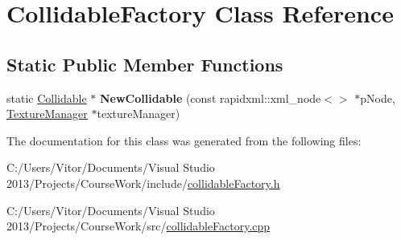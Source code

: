 \hypertarget{class_collidable_factory}{}\section{Collidable\+Factory Class Reference}
\label{class_collidable_factory}
\subsection*{Static Public Member Functions}
\begin{DoxyCompactItemize}
\item 
\hypertarget{class_collidable_factory_aaa9a7228a427cd9b69624b7e29c268ee}{}static \hyperlink{class_collidable}{Collidable} $\ast$ {\bfseries New\+Collidable} (const rapidxml\+::xml\+\_\+node$<$$>$ $\ast$p\+Node, \hyperlink{class_texture_manager}{Texture\+Manager} $\ast$texture\+Manager)\label{class_collidable_factory_aaa9a7228a427cd9b69624b7e29c268ee}

\end{DoxyCompactItemize}


The documentation for this class was generated from the following files\+:\begin{DoxyCompactItemize}
\item 
C\+:/\+Users/\+Vitor/\+Documents/\+Visual Studio 2013/\+Projects/\+Course\+Work/include/\hyperlink{collidable_factory_8h}{collidable\+Factory.\+h}\item 
C\+:/\+Users/\+Vitor/\+Documents/\+Visual Studio 2013/\+Projects/\+Course\+Work/src/\hyperlink{collidable_factory_8cpp}{collidable\+Factory.\+cpp}\end{DoxyCompactItemize}

